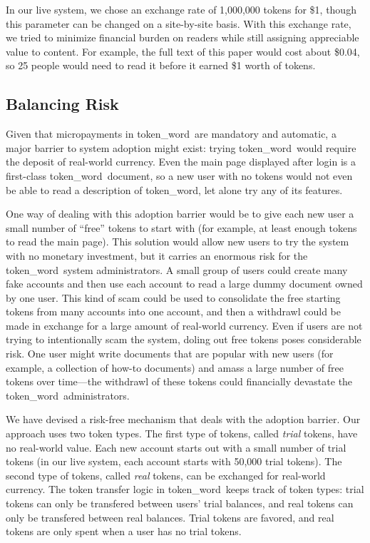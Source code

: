 \documentclass{acm_proc_article-sp}
\newcommand{\tokenWord}{token\_word}
\begin{document}
In our live system, we chose an exchange rate of 1,000,000 tokens for \$1, though this parameter can be changed on a site-by-site basis.
With this exchange rate, we tried to minimize financial burden on readers while still assigning appreciable value to content.
For example, the full text of this paper would cost about \$0.04, so 25 people would need to read it before it earned \$1 worth of tokens.


\subsection{Balancing Risk}
Given that micropayments in \tokenWord \  are mandatory and automatic, a major barrier to system adoption might exist:  trying \tokenWord \  would require the deposit of real-world currency.
Even the main page displayed after login is a first-class \tokenWord \  document, so a new user with no tokens would not even be able to read a description of \tokenWord, let alone try any of its features.

One way of dealing with this adoption barrier would be to give each new user a small number of ``free'' tokens to start with (for example, at least enough tokens to read the main page).
This solution would allow new users to try the system with no monetary investment, but it carries an enormous risk for the \tokenWord \  system administrators.
A small group of users could create many fake accounts and then use each account to read a large dummy document owned by one user.
This kind of scam could be used to consolidate the free starting tokens from many accounts into one account, and then a withdrawl could be made in exchange for a large amount of real-world currency.
Even if users are not trying to intentionally scam the system, doling out free tokens poses considerable risk.
One user might write documents that are popular with new users (for example, a collection of how-to documents) and amass a large number of free tokens over time---the withdrawl of these tokens could financially devastate the \tokenWord \  administrators.

We have devised a risk-free mechanism that deals with the adoption barrier.  
Our approach uses two token types.
The first type of tokens, called \textit{trial} tokens, have no real-world value.
Each new account starts out with a small number of trial tokens (in our live system, each account starts with 50,000 trial tokens).
The second type of tokens, called \textit{real} tokens, can be exchanged for real-world currency.
The token transfer logic in \tokenWord \  keeps track of token types:  trial tokens can only be transfered between users' trial balances, and real tokens can only be transfered between real balances.
Trial tokens are favored, and real tokens are only spent when a user has no trial tokens.
\end{document}
